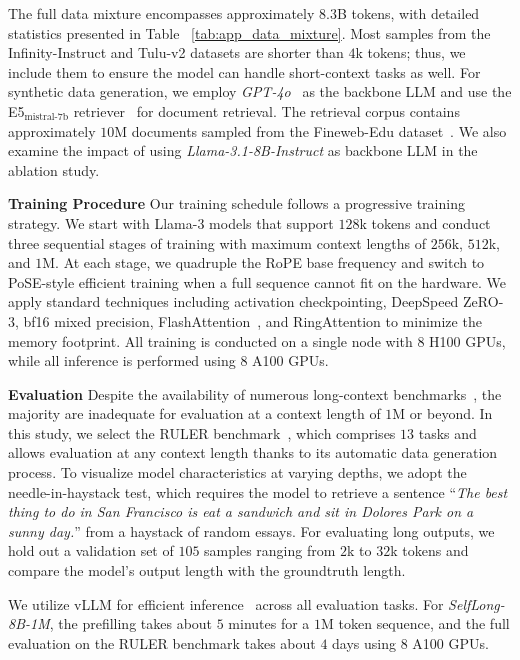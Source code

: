 \documentclass{article}
\begin{document}
The full data mixture encompasses approximately $8.3$B tokens,
with detailed statistics presented in Table ~\ref{tab:app_data_mixture}.
Most samples from the Infinity-Instruct and Tulu-v2 datasets are shorter than $4$k tokens;
thus,
we include them to ensure the model can handle short-context tasks as well.
For synthetic data generation,
we employ \emph{GPT-4o}~\citep{hurst2024gpt} as the backbone LLM
and use the E5$_\text{mistral-7b}$ retriever~\citep{wang2023improving} for document retrieval.
The retrieval corpus contains approximately $10$M documents sampled from the Fineweb-Edu dataset~\citep{penedo2024fineweb}.
We also examine the impact of using \emph{Llama-3.1-8B-Instruct} as backbone LLM in the ablation study.

\noindent
\textbf{Training Procedure }
Our training schedule follows a progressive training strategy.
We start with Llama-3 models that support $128$k tokens and
conduct three sequential stages of training with maximum context lengths of $256$k, $512$k, and $1$M.
At each stage,
we quadruple the RoPE base frequency and switch to PoSE-style efficient training
when a full sequence cannot fit on the hardware.
We apply standard techniques including activation checkpointing, DeepSpeed ZeRO-3, bf16 mixed precision,
FlashAttention~\citep{daoflashattention}, and RingAttention to minimize the memory footprint.
All training is conducted on a single node with 8 H100 GPUs,
while all inference is performed using 8 A100 GPUs.

\noindent
\textbf{Evaluation }
Despite the availability of numerous long-context benchmarks~\citep{bai2023longbench,shaham2023zeroscrolls,zhang2024bench},
the majority are inadequate for evaluation at a context length of $1$M or beyond.
In this study,
we select the RULER benchmark~\citep{hsieh2024ruler},
which comprises $13$ tasks
and allows evaluation at any context length thanks to its automatic data generation process.
To visualize model characteristics at varying depths,
we adopt the needle-in-haystack test,
which requires the model to retrieve a sentence ``\emph{The best thing to do in San Francisco is eat a sandwich and sit in Dolores Park on a sunny day.}''
from a haystack of random essays.
For evaluating long outputs,
we hold out a validation set of $105$ samples ranging from $2$k to $32$k tokens
and compare the model's output length with the groundtruth length.

We utilize vLLM for efficient inference~\citep{kwon2023efficient} across all evaluation tasks.
For \emph{SelfLong-8B-1M},
the prefilling takes about $5$ minutes for a $1$M token sequence,
and the full evaluation on the RULER benchmark takes about $4$ days using $8$ A100 GPUs.
\end{document}

